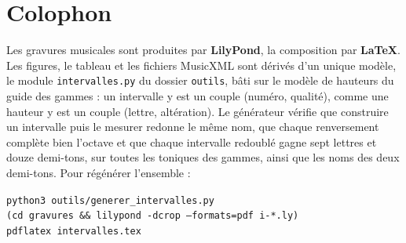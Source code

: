 \documentclass[a4paper,11pt]{article}
\begin{document}
\section*{Colophon}

Les gravures musicales sont produites par \textbf{LilyPond}, la composition
par \textbf{\LaTeX}. Les figures, le tableau et les fichiers MusicXML sont
dérivés d'un unique modèle, le module \texttt{intervalles.py} du dossier \texttt{outils}, bâti
sur le modèle de hauteurs du guide des gammes : un intervalle y est un couple
(numéro, qualité), comme une hauteur y est un couple (lettre, altération). Le
générateur vérifie que construire un intervalle puis le mesurer redonne le
même nom, que chaque renversement complète bien l'octave et que chaque
intervalle redoublé gagne sept lettres et douze demi-tons, sur toutes les
toniques des gammes, ainsi que les noms des deux demi-tons. Pour régénérer l'ensemble :

\begin{center}
\texttt{python3 outils/generer\_intervalles.py}\\
\texttt{(cd gravures \&\& lilypond -dcrop --formats=pdf i-*.ly)}\\
\texttt{pdflatex intervalles.tex}
\end{center}
\end{document}
